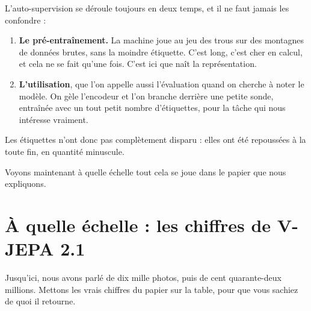 \begin{aretenir}
L'auto-supervision se déroule toujours en deux temps, et il ne faut jamais
les confondre :

\begin{enumerate}
  \item \textbf{Le pré-entraînement.} La machine joue au jeu des trous sur des
        montagnes de données brutes, sans la moindre étiquette. C'est long,
        c'est cher en calcul, et cela ne se fait qu'une fois. C'est ici que
        naît la représentation.
  \item \textbf{L'utilisation}, que l'on appelle aussi l'évaluation quand on
        cherche à noter le modèle. On gèle l'encodeur et l'on branche derrière
        une petite sonde, entraînée avec un tout petit nombre d'étiquettes,
        pour la tâche qui nous intéresse vraiment.
\end{enumerate}

Les étiquettes n'ont donc pas complètement disparu : elles ont été repoussées
à la toute fin, en quantité minuscule.
\end{aretenir}

Voyons maintenant à quelle échelle tout cela se joue dans le papier que nous
expliquons.

\section{À quelle échelle : les chiffres de V-JEPA 2.1}

Jusqu'ici, nous avons parlé de dix mille photos, puis de cent quarante-deux
millions. Mettons les vrais chiffres du papier sur la table, pour que vous
sachiez de quoi il retourne.

